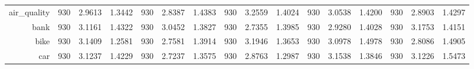 \begin{table}[htbp]
{\begin{tabular}{rccccccccccccccc}
                  air\_quality                        & 930                                     & 2.9613                                                                    & 1.3442          & 930                            & \cellcolor[rgb]{ .776,  .937,  .808}\textcolor[rgb]{ 0,  .38,  0}{2.8387} & 1.4383          & 930                             & 3.2559                                                                             & 1.4024          & 930                             & 3.0538                                                                    & 1.4200          & 930                             & 2.8903                                                                    & 1.4297          \\
                  bank                                & 930                                     & 3.1161                                                                    & 1.4322          & 930                            & 3.0452                                                                    & 1.3827          & 930                             & \cellcolor[rgb]{ .776,  .937,  .808}\textcolor[rgb]{ 0,  .38,  0}{2.7355}          & 1.3985          & 930                             & 2.9280                                                                    & 1.4028          & 930                             & 3.1753                                                                    & 1.4151          \\
                  bike                                & 930                                     & 3.1409                                                                    & 1.2581          & 930                            & \cellcolor[rgb]{ .776,  .937,  .808}\textcolor[rgb]{ 0,  .38,  0}{2.7581} & 1.3914          & 930                             & 3.1946                                                                             & 1.3653          & 930                             & 3.0978                                                                    & 1.4978          & 930                             & 2.8086                                                                    & 1.4905          \\
                  car                                 & 930                                     & 3.1237                                                                    & 1.4229          & 930                            & \cellcolor[rgb]{ .776,  .937,  .808}\textcolor[rgb]{ 0,  .38,  0}{2.7237} & 1.3575          & 930                             & 2.8763                                                                             & 1.2987          & 930                             & 3.1538                                                                    & 1.3846          & 930                             & 3.1226                                                                    & 1.5473          \\

\end{tabular}}
\end{table}
